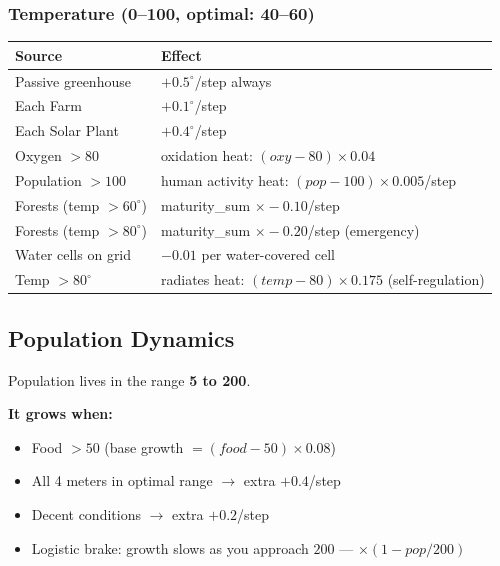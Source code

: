 \documentclass[12pt,a4paper]{article}
\begin{document}
\subsubsection*{Temperature (0--100, optimal: 40--60)}
\vspace{0.1cm}
\begin{center}
\small
\begin{tabular}{ll}
\toprule
\textbf{Source} & \textbf{Effect} \\
\midrule
Passive greenhouse               & $+0.5^\circ$/step always \\
Each Farm                        & $+0.1^\circ$/step \\
Each Solar Plant                 & $+0.4^\circ$/step \\
Oxygen $> 80$                    & oxidation heat: $(oxy - 80) \times 0.04$ \\
Population $> 100$               & human activity heat: $(pop - 100) \times 0.005$/step \\
Forests (temp $> 60^\circ$)      & maturity\_sum $\times -0.10$/step \\
Forests (temp $> 80^\circ$)      & maturity\_sum $\times -0.20$/step (emergency) \\
Water cells on grid              & $-0.01$ per water-covered cell \\
Temp $> 80^\circ$                & radiates heat: $(temp - 80) \times 0.175$ (self-regulation) \\
\bottomrule
\end{tabular}
\end{center}

\subsection{Population Dynamics}

Population lives in the range \textbf{5 to 200}.

\textbf{It grows when:}
\begin{itemize}[leftmargin=1.5cm]
    \item Food $> 50$ (base growth $= (food - 50) \times 0.08$)
    \item All 4 meters in optimal range $\to$ extra $+0.4$/step
    \item Decent conditions $\to$ extra $+0.2$/step
    \item Logistic brake: growth slows as you approach $200$ --- $\times(1 - pop/200)$
\end{itemize}
\end{document}
